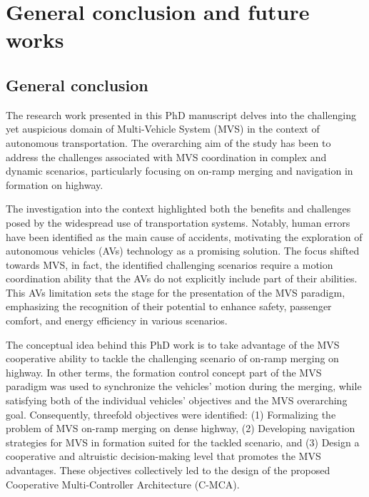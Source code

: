 \chapter*{General conclusion and future works}

\section*{General conclusion}
The research work presented in this PhD manuscript delves into the challenging yet auspicious domain of Multi-Vehicle System (MVS) in the context of autonomous transportation. The overarching aim of the study has been to address the challenges associated with MVS coordination in complex and dynamic scenarios, particularly focusing on on-ramp merging and navigation in formation on highway. 

The investigation into the context highlighted both the benefits and challenges posed by the widespread use of transportation systems. Notably, human errors have been identified as the main cause of accidents, motivating the exploration of autonomous vehicles (AVs) technology as a promising solution. The focus shifted towards MVS, in fact, the identified challenging scenarios require a motion coordination ability that the AVs do not explicitly include part of their abilities. This AVs limitation sets the stage for the presentation of the MVS paradigm, emphasizing the recognition of their potential to enhance safety, passenger comfort, and energy efficiency in various scenarios. 


The conceptual idea behind this PhD work is to take advantage of the MVS cooperative ability to tackle the challenging scenario of on-ramp merging on highway. In other terms, the formation control concept part of the MVS paradigm was used to synchronize the vehicles' motion during the merging, while satisfying both of the individual vehicles' objectives and the MVS overarching goal. Consequently, threefold objectives were identified: (1) Formalizing the problem of MVS on-ramp merging on dense highway, (2) Developing navigation strategies for MVS in formation suited for the tackled scenario, and (3) Design a cooperative and altruistic decision-making level that promotes the MVS advantages. These objectives collectively led to the design of the proposed Cooperative Multi-Controller Architecture (C-MCA). 


